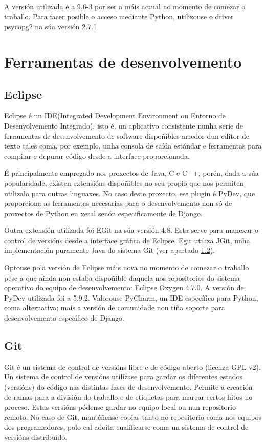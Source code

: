 A versión utilizada é a 9.6-3 por ser a máis actual no momento de comezar o traballo. Para facer posible o acceso mediante Python, utilizouse o driver psycopg2 na súa versión 2.7.1


\section{Ferramentas de desenvolvemento}

\subsection{Eclipse}
\label{eclipse}

Eclipse é un IDE(Integrated Development Environment ou Entorno de Desenvolvemento Integrado), isto é, un aplicativo consistente nunha serie de ferramentas de desenvolvemento de software dispoñibles arredor dun editor de texto tales coma, por exemplo, unha consola de saída estándar e ferramentas para compilar e depurar código desde a interface proporcionada.

É principalmente empregado nos proxectos de Java, C e C++, porén, dada a súa popularidade, existen extensións dispoñibles no seu propio  que nos permiten utilizalo para outras linguaxes. No caso deste proxecto, ese plugin é PyDev, que proporciona as ferramentas necesarias para o desenvolvemento non só de proxectos de Python en xeral senón especificamente de Django.

Outra extensión utilizada foi EGit na súa versión 4.8. Esta serve para manexar o control de versións  desde a interface gráfica de Eclipse. Egit utiliza JGit, unha implementación puramente Java do sistema Git (ver apartado \ref{git}).

Optouse pola versión de Eclipse máis nova no momento de comezar o traballo pese a que aínda non estaba dispoñible daquela nos repositorios do sistema operativo do equipo de desenvolvemento: Eclipse Oxygen 4.7.0. A versión de PyDev utilizada foi a 5.9.2. Valorouse PyCharm, un IDE específico para Python, coma alternativa; mais a versión de comunidade non tiña soporte para desenvolvemento específico de Django\cite{pycharm}.
 


\subsection{Git}
\label{git}

Git é un sistema de control de versións libre e de código aberto (licenza GPL v2). Un sistema de control de versións utilízase para gardar os diferentes estados (versións) do código nas distintas fases de desenvolvemento. Permite a creación de ramas para a división do traballo e de etiquetas para marcar certos hitos no proceso. Estas versións pódense gardar no equipo local ou nun repositorio remoto. No caso de Git, mantéñense copias tanto no repositorio coma nos equipos dos programadores, polo cal adoita cualificarse coma un sistema de control de versións distribuído\cite{git}.

